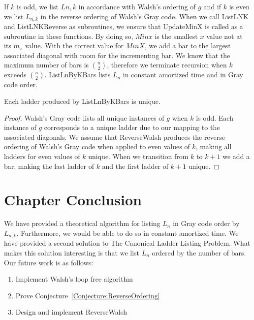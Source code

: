 \begin{theorem}
\begin{theorem}
If $k$ is odd, we list $L{n,k}$ in accordance with Walsh's ordering of $g$ and if $k$ is even 
we list $L_{n,k}$ in the reverse ordering of Walsh's Gray code. When we call {\sc ListLNK} and {\sc ListLNKReverse} 
as subroutines, we ensure that {\sc UpdateMinX} is called as a subroutine in these functions. By doing so, $Minx$ 
is the smallest $x$ value not at its $m_{x}$ value. With the correct value for $MinX$, we 
add a bar to the largest associated diagonal with 
room for the incrementing bar. We know that the maximum number of bars is ${n \choose 2}$, therefore we terminate 
recursion when $k$ exceeds ${n \choose 2}$. {\sc ListLnByKBars} lists $L_{n}$ in constant amortized 
time and in Gray code order. 
\begin{lemma}
  Each ladder produced by {\sc ListLnByKBars} is unique. 
  \label{Lemma:LNKUnique}
\end{lemma}
\begin{proof}
  Walsh's Gray code lists all unique instances of $g$ when $k$ is odd. Each instance of $g$ 
  corresponds to a unique ladder due to our mapping to the associated diagonals. We assume that {\sc ReverseWalsh}
  produces the reverse ordering of Walsh's Gray code when applied to even values of $k$, making all ladders for even values of $k$ 
  unique. When we transition from $k$ to $k+1$ we add a bar, making the last ladder of $k$ and the first ladder of $k+1$ unique.
\end{proof}
\section{Chapter Conclusion}
We have provided a theoretical algorithm for listing $L_{n}$ in Gray code order by $L_{n,k}$. Furthermore, we would 
be able to do so in constant amortized time. We have provided a second solution to The Canonical Ladder Listing Problem. 
What makes this solution interesting is that we list $L_{n}$ ordered by the number of bars. Our future work is as follows:
\begin{enumerate}
  \item Implement Walsh's loop free algorithm
  \item Prove Conjecture~\ref{Conjecture:ReverseOrdering}
  \item Design and implement {\sc ReverseWalsh}
\end{enumerate}






\end{theorem}
\end{theorem}
